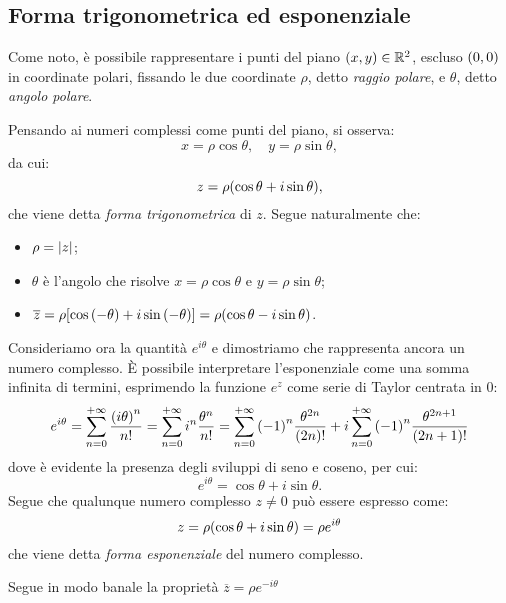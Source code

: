     \subsection{Forma trigonometrica ed esponenziale}
        Come noto, \`e possibile rappresentare i punti del piano $\qty(x,y)\in\mathbb{R}^2$, escluso $\qty(0,0)$ in coordinate polari, fissando le due coordinate $\rho$, detto \emph{raggio polare}, e $\theta$, detto \emph{angolo polare}. \par Pensando ai numeri complessi come punti del piano, si osserva: $$x=\rho\cos\theta,\quad y=\rho\sin\theta,$$ da cui: $$z=\rho\qty(\cos\theta+i\sin\theta),$$ che viene detta \emph{forma trigonometrica} di $z$. Segue naturalmente che:
        \begin{itemize}
            \item $\rho=\abs{z}$;
            \item $\theta$ \`e l'angolo che risolve $x=\rho\cos\theta$ e $y=\rho\sin\theta$;
            \item $\overline{z}=\rho\qty[\cos\qty(-\theta)+i\sin\qty(-\theta)]=\rho\qty(\cos\theta-i\sin\theta)$.
        \end{itemize}
        \par Consideriamo ora la quantit\`a $e^{i\theta}$ e dimostriamo che rappresenta ancora un numero complesso. \`E possibile interpretare l'esponenziale come una somma infinita di termini, esprimendo la funzione $e^z$ come serie di Taylor centrata in $0$: $$e^{i\theta}=\sum_{n=0}^{+\infty}\frac{\qty(i\theta)^n}{n!}=\sum_{n=0}^{+\infty}i^n\frac{\theta^n}{n!}=\sum_{n=0}^{+\infty}\qty(-1)^n\frac{\theta^{2n}}{\qty(2n)!}+i\sum_{n=0}^{+\infty}\qty(-1)^n\frac{\theta^{2n+1}}{\qty(2n+1)!}$$ dove \`e evidente la presenza degli sviluppi di seno e coseno, per cui: $$e^{i\theta}=\cos\theta+i\sin\theta.$$ Segue che qualunque numero complesso $z\neq 0$ pu\`o essere espresso come: $$z=\rho\qty(\cos\theta+i\sin\theta)=\rho e^{i\theta}$$ che viene detta \emph{forma esponenziale} del numero complesso. \par Segue in modo banale la propriet\`a $\overline{z}=\rho e^{-i\theta}$





